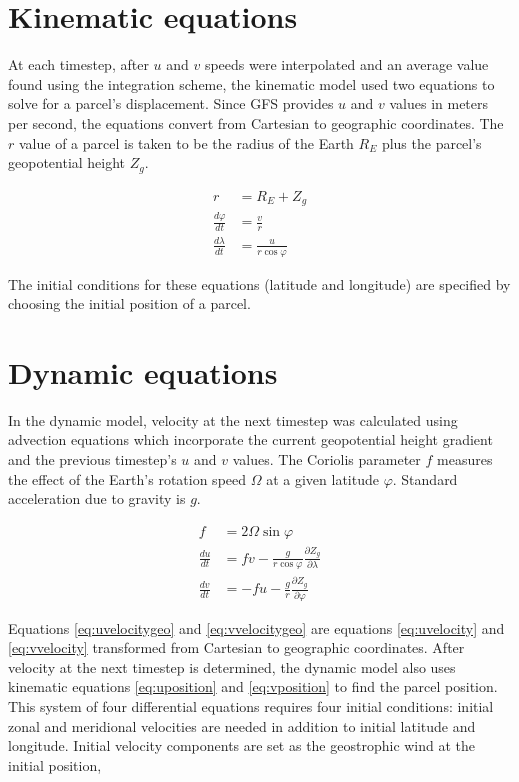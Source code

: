 \section{Kinematic equations}
At each timestep, after $u$ and $v$ speeds were interpolated and an average value found using the integration scheme, the kinematic model used two equations to solve for a parcel's displacement. 
Since GFS provides $u$ and $v$ values in meters per second, the equations convert from Cartesian to geographic coordinates. 
The $r$ value of a parcel is taken to be the radius of the Earth $R_E$ plus the parcel's geopotential height $Z_g$.

\begin{align}
    r &= R_E + Z_g \\[2ex]
    \frac{d \varphi}{dt} &= \frac{v}{r} \label{eq:uposition} \\
    \frac{d \lambda}{dt} &= \frac{u}{r \cos{\varphi}} \label{eq:vposition}
\end{align}

The initial conditions for these equations (latitude and longitude) are specified by choosing the initial position of a parcel.

\section{Dynamic equations}
In the dynamic model, velocity at the next timestep was calculated using advection equations which incorporate the current geopotential height gradient and the previous timestep's $u$ and $v$ values.
The Coriolis parameter $f$ measures the effect of the Earth's rotation speed $\Omega$ at a given latitude $\varphi$.
Standard acceleration due to gravity is $g$. 

\begin{align}
    f &= 2 \Omega \sin{\varphi} \\[2ex]
    \frac{du}{dt} &= fv - \frac{g}{r \cos{\varphi}} \frac{\partial Z_g}{\partial \lambda} \label{eq:uvelocitygeo}\\
    \frac{dv}{dt} &= -fu -\frac{g}{r} \frac{\partial Z_g}{\partial \varphi} \label{eq:vvelocitygeo}
\end{align}

Equations \ref{eq:uvelocitygeo} and \ref{eq:vvelocitygeo} are equations \ref{eq:uvelocity} and \ref{eq:vvelocity} transformed from Cartesian to geographic coordinates. 
After velocity at the next timestep is determined, the dynamic model also uses kinematic equations \ref{eq:uposition} and \ref{eq:vposition} to find the parcel position.
This system of four differential equations requires four initial conditions: initial zonal and meridional velocities are needed in addition to initial latitude and longitude.
Initial velocity components are set as the geostrophic wind at the initial position,

